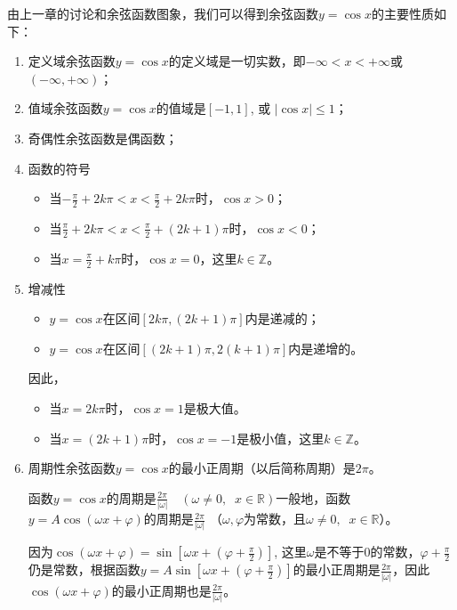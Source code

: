 由上一章的讨论和余弦函数图象，我们可以得到余弦函数$y=\cos x$的主要性质如下：
\begin{enumerate}
\item 定义域\quad  余弦函数$y=\cos x$的定义域是一切实数，即$-\infty<x<+\infty$或$(-\infty, +\infty)$；
\item 值域\quad 余弦函数$y=\cos x$的值域是$[-1, 1]$, 或
$|\cos x|\le 1$；
\item 奇偶性\quad 余弦函数是偶函数；
\item 函数的符号
\begin{itemize}
    \item 当$-\frac{\pi}{2}+2k\pi<x<\frac{\pi}{2}+2k\pi$时，$\cos x>0$；
    \item 当$\frac{\pi}{2}+2k\pi<x<\frac{\pi}{2}+(2k+1)\pi$时，$\cos x<0$；
    \item 当$x=\frac{\pi}{2}+k\pi$时，$\cos x=0$，这里$k\in\mathbb{Z}$。
\end{itemize}

\item 增减性
\begin{itemize}
    \item $y=\cos x$在区间$[2k\pi,(2k+1)\pi]$内是递减的；
    \item $y=\cos x$在区间$[(2k+1)\pi,2(k+1)\pi]$内是递增的。
\end{itemize}
因此，
\begin{itemize}
    \item 当$x=2k\pi$时，$\cos x=1$是极大值。
    \item 当$x=(2k+1)\pi$时，$\cos x=-1$是极小值，这里$k\in\mathbb{Z}$。
\end{itemize}

\item 周期性\quad 余弦函数$y=\cos x$的最小正周期（以后简称周期）是$2\pi$。

函数$y=\cos x$的周期是$\frac{2\pi}{|\omega|}\quad (\omega\ne 0,\;\;x\in \mathbb{R})$一般地，函数$y=A\cos(\omega x+\varphi)$的周期是$\frac{2\pi}{|\omega|}$
（$\omega,\varphi$为常数，且$\omega\ne 0,\;\;x\in \mathbb{R}$）。

因为$\cos(\omega x+\varphi)=\sin\left[\omega x+\left(\varphi+\frac{\pi}{2}\right)\right]$, 这里$\omega$是不等于0的常数，$\varphi+\frac{\pi}{2}$仍是常数，根据函数$y=A\sin\left[\omega x+\left(\varphi+\frac{\pi}{2}\right)\right]$的最小正周期是$\frac{2\pi}{|\omega|}$，因此
$\cos(\omega x+\varphi)$的最小正周期也是$\frac{2\pi}{|\omega|}$。

\end{enumerate}


